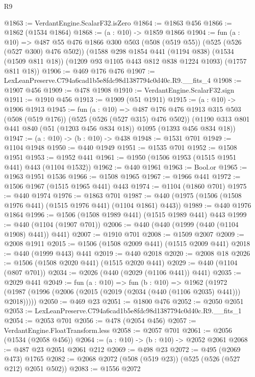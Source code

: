 \begin{lexlean}{R9}
\begin{coremodule}
@1863 := VerdantEngine.ScalarF32.isZero
@1864 := @1863 @456
@1866 := @1862 (@1534 @1864)
@1868 := (a : @10) -> @1859 @1866
@1904 := fun (a : @10) =>
  @487
    @55
    @476
    @1866
    @300
    @503
    (@508 (@519 @55))
    (@525 (@526 (@527 @300) @476 @502))
    (@1588
      @298
      @1854
      @441
      (@1194 @838)
      (@1534 (@1509 @811 @18))
      (@1209 @93 @1105 @443 @812 @838 @1224 @1093)
      (@1757 @811 @18))
@1906 := @469 @176 @476
@1907 := LexLeanPreserve.C794a6cad1b5e8fdc98d1387794c0d40c.R9.__fits_4
@1908 := @1907 @456
@1909 := @478 @1908
@1910 := VerdantEngine.ScalarF32.sign
@1911 := @1910 @456
@1913 := @1909 (@51 @1911)
@1915 := (a : @10) -> @1906 @1913
@1945 := fun (a : @10) =>
  @487
    @176
    @476
    @1913
    @315
    @503
    (@508 (@519 @176))
    (@525 (@526 (@527 @315) @476 @502))
    (@1190 @313 @801 @441 @840 (@51 (@1203 @456 @834 @18)) @1095 (@1393 @456 @834 @18))
@1947 := (a : @10) -> (b : @10) -> @438
@1948 := @1531 @701
@1949 := @1104 @1948
@1950 := @440 @1949
@1951 := @1535 @701
@1952 := @1508 @1951
@1953 := @1952 @441
@1961 := @1950 (@1506 @1953 (@1515 @1951 @441) @443 (@1104 @1532))
@1962 := @440 @1961
@1963 := Bool.or
@1965 := @1963 @1951 @1536
@1966 := @1508 @1965
@1967 := @1966 @441
@1972 := @1506 @1967 (@1515 @1965 @441) @443
@1974 := @1104 (@1860 @701)
@1975 := @440 @1974
@1976 := @1863 @701
@1987 := @440 (@1975 (@1506 (@1508 @1976 @441) (@1515 @1976 @441) (@1104 @1861) @443))
@1989 := @440 @1976 @1864
@1996 := @1506 (@1508 @1989 @441) (@1515 @1989 @441) @443
@1999 := @440 (@1104 (@1907 @701))
@2006 := @440 (@440 (@1999 (@440 (@1104 @1908) @441)) @441)
@2007 := @1910 @701
@2008 := @1509 @2007
@2009 := @2008 @1911
@2015 := @1506 (@1508 @2009 @441) (@1515 @2009 @441)
@2018 := @440 (@1999 @443) @441
@2019 := @440 @2018
@2020 := @2008 @18
@2026 := @1506 (@1508 @2020 @441) (@1515 @2020 @441)
@2029 := @440 (@1104 (@807 @701))
@2034 := @2026 (@440 (@2029 (@1106 @441)) @441)
@2035 := @2029 @441
@2049 := fun (a : @10) =>
  fun (b : @10) =>
  @1962 (@1972 (@1987 (@1996 (@2006 (@2015 (@2019 (@2034 (@440 (@1106 @2035) @441))) @2018)))))
@2050 := @469 @23
@2051 := @1800 @476
@2052 := @2050 @2051
@2053 := LexLeanPreserve.C794a6cad1b5e8fdc98d1387794c0d40c.R9.__fits_1
@2054 := @2053 @701
@2056 := @478 (@2054 @456)
@2057 := VerdantEngine.FloatTransform.less
@2058 := @2057 @701
@2061 := @2056 (@1534 (@2058 @456))
@2064 := (a : @10) -> (b : @10) -> @2052 @2061
@2068 := @487 @23 @2051 @2061 @212
@2069 := @498 @23
@2072 := @495 (@2069 @473) @1765
@2082 := @2068 @2072 (@508 (@519 @23)) (@525 (@526 (@527 @212) @2051 @502))
@2083 := @1556 @2072

\end{coremodule}
\end{lexlean}
